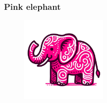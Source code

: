 \subsubsection{Pink elephant}

\begin{center}
    \begin{figure}[H]
        \centering
        \includegraphics[height=120pt]{pink_elephant.png}
        \label{fig:pink_elephant}
        \vspace{-3em}
    \end{figure}
\end{center}
